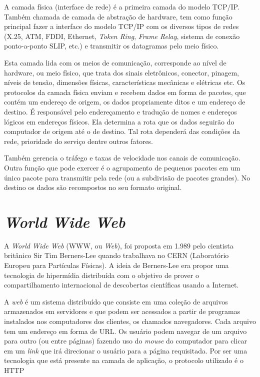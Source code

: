 A camada física (interface de rede) é a primeira camada do modelo TCP/IP. 
Também chamada de camada de abstração de hardware, tem como função principal 
fazer a interface do modelo TCP/IP com os diversos tipos de redes (X.25, ATM, 
FDDI, Ethernet, \textit{Token Ring}, \textit{Frame Relay}, sistema de conexão 
ponto-a-ponto SLIP, etc.) e transmitir os datagramas pelo meio físico.

Esta camada lida com os meios de comunicação, corresponde ao nível de hardware, 
ou meio físico, que trata dos sinais eletrônicos, conector, pinagem, níveis de 
tensão, dimensões físicas, características mecânicas e elétricas etc. Os 
protocolos da camada física enviam e recebem dados em forma de pacotes, que 
contém um endereço de origem, os dados propriamente ditos e um endereço de 
destino. É responsável pelo endereçamento e tradução de nomes e endereços 
lógicos em endereços físicos. Ela determina a rota que os dados seguirão do 
computador de origem até o de destino. Tal rota dependerá das condições da 
rede, prioridade do serviço dentre outros fatores.

Também gerencia o tráfego e taxas de velocidade nos canais de comunicação. 
Outra função que pode exercer é o agrupamento de pequenos pacotes em um único 
pacote para transmitir pela rede (ou a subdivisão de pacotes grandes). No 
destino os dados são recompostos no seu formato original.

\section{\textit{World Wide Web}}

A \textit{World Wide Web} (WWW, ou \textit{Web}), foi proposta em 1.989 pelo 
cientista britânico Sir Tim Berners-Lee quando trabalhava no CERN (Laboratório 
Europeu para Partículas Físicas). A ideia de Berners-Lee era propor uma 
tecnologia de hipermídia distribuída com o objetivo de prover o 
compartilhamento internacional de descobertas científicas usando a Internet.

A \textit{web} é um sistema distribuído que consiste em uma coleção de 
arquivos armazenados em servidores e que podem ser acessados a partir de 
programas instalados nos computadores dos clientes, os chamados navegadores. 
Cada arquivo tem um endereço em forma de URL. Os usuário podem navegar de um 
arquivo para outro (ou entre páginas) fazendo uso do \textit{mouse} do 
computador para clicar em um \textit{link} que irá direcionar o usuário para a 
página requisitada. Por ser uma tecnologia que está presente na camada de 
aplicação, o protocolo utilizado é o HTTP

